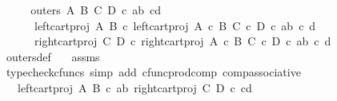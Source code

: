 \begin{isabellebody}
%
\isadelimproof
%
\endisadelimproof
%
\isatagproof
{}\isamarkupfalse%
\ {\isacharminus}{\kern0pt}\isanewline
\ \ \isamarkupfalse%
\ {\isachardoublequoteopen}outers\ A\ B\ C\ D\ {\isasymcirc}\isactrlsub c\ {\isasymlangle}{\isasymlangle}a{\isacharcomma}{\kern0pt}b{\isasymrangle}{\isacharcomma}{\kern0pt}\ {\isasymlangle}c{\isacharcomma}{\kern0pt}d{\isasymrangle}{\isasymrangle}\ {\isacharequal}{\kern0pt}\ {\isasymlangle}\isanewline
\ \ \ \ \ \ left{\isacharunderscore}{\kern0pt}cart{\isacharunderscore}{\kern0pt}proj\ A\ B\ {\isasymcirc}\isactrlsub c\ left{\isacharunderscore}{\kern0pt}cart{\isacharunderscore}{\kern0pt}proj\ {\isacharparenleft}{\kern0pt}A\ {\isasymtimes}\isactrlsub c\ B{\isacharparenright}{\kern0pt}\ {\isacharparenleft}{\kern0pt}C\ {\isasymtimes}\isactrlsub c\ D{\isacharparenright}{\kern0pt}\ {\isasymcirc}\isactrlsub c\ {\isasymlangle}{\isasymlangle}a{\isacharcomma}{\kern0pt}b{\isasymrangle}{\isacharcomma}{\kern0pt}\ {\isasymlangle}c{\isacharcomma}{\kern0pt}\ d{\isasymrangle}{\isasymrangle}{\isacharcomma}{\kern0pt}\isanewline
\ \ \ \ \ \ right{\isacharunderscore}{\kern0pt}cart{\isacharunderscore}{\kern0pt}proj\ C\ D\ {\isasymcirc}\isactrlsub c\ right{\isacharunderscore}{\kern0pt}cart{\isacharunderscore}{\kern0pt}proj\ {\isacharparenleft}{\kern0pt}A\ {\isasymtimes}\isactrlsub c\ B{\isacharparenright}{\kern0pt}\ {\isacharparenleft}{\kern0pt}C\ {\isasymtimes}\isactrlsub c\ D{\isacharparenright}{\kern0pt}\ {\isasymcirc}\isactrlsub c\ {\isasymlangle}{\isasymlangle}a{\isacharcomma}{\kern0pt}b{\isasymrangle}{\isacharcomma}{\kern0pt}\ {\isasymlangle}c{\isacharcomma}{\kern0pt}\ d{\isasymrangle}{\isasymrangle}\isanewline
\ \ \ \ {\isasymrangle}{\isachardoublequoteclose}\isanewline
\ \ \ \ \isamarkupfalse%
\ outers{\isacharunderscore}{\kern0pt}def\ \ \isamarkupfalse%
\ assms\ \isamarkupfalse%
\ {\isacharparenleft}{\kern0pt}typecheck{\isacharunderscore}{\kern0pt}cfuncs{\isacharcomma}{\kern0pt}\ simp\ add{\isacharcolon}{\kern0pt}\ cfunc{\isacharunderscore}{\kern0pt}prod{\isacharunderscore}{\kern0pt}comp\ comp{\isacharunderscore}{\kern0pt}associative{}{\isacharparenright}{\kern0pt}\isanewline
\ \ \isamarkupfalse%
\ \isamarkupfalse%
\ {\isachardoublequoteopen}{\isachardot}{\kern0pt}{\isachardot}{\kern0pt}{\isachardot}{\kern0pt}\ {\isacharequal}{\kern0pt}\ {\isasymlangle}left{\isacharunderscore}{\kern0pt}cart{\isacharunderscore}{\kern0pt}proj\ A\ B\ {\isasymcirc}\isactrlsub c\ {\isasymlangle}a{\isacharcomma}{\kern0pt}b{\isasymrangle}{\isacharcomma}{\kern0pt}\ right{\isacharunderscore}{\kern0pt}cart{\isacharunderscore}{\kern0pt}proj\ C\ D\ {\isasymcirc}\isactrlsub c\ {\isasymlangle}c{\isacharcomma}{\kern0pt}d{\isasymrangle}{\isasymrangle}{\isachardoublequoteclose}\isanewline

\end{isabellebody}
